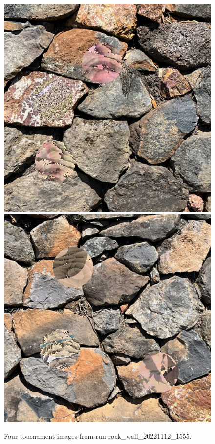 \documentclass[acmtog]{acmart}
\begin{document}
\begin{figure}
    \hfill
    \includegraphics[scale=0.24]{20221112_1555_step_5681.png}
    \hfill
    \includegraphics[scale=0.24]{20221112_1555_step_6370.png}
    \caption{Four tournament images from run rock\_wall\_20221112\_1555.}
    \label{fig:rock_wall_4x}
\end{figure}
\end{document}
